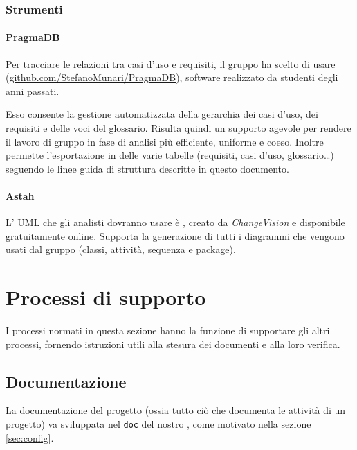 	\subsubsection{Strumenti}
		\paragraph{PragmaDB}
		Per tracciare le relazioni tra casi d'uso e requisiti, il gruppo ha scelto di usare  (\url{github.com/StefanoMunari/PragmaDB}), software realizzato da studenti degli anni passati.
		
		Esso consente la gestione automatizzata della gerarchia dei casi d'uso, dei requisiti e delle voci del glossario. Risulta quindi un supporto agevole per rendere il lavoro di gruppo in fase di analisi più efficiente, uniforme e coeso. Inoltre permette l'esportazione in  delle varie tabelle (requisiti, casi d'uso, glossario\dots) seguendo le linee guida di struttura descritte in questo documento.

		\paragraph{Astah}
		L' UML che gli analisti dovranno usare è , creato da \emph{ChangeVision} e disponibile gratuitamente online. Supporta la generazione di tutti i diagrammi che vengono usati dal gruppo (classi, attività, sequenza e package).





\section{Processi di supporto} \label{sec:supporto}
I processi normati in questa sezione hanno la funzione di supportare gli altri processi, fornendo istruzioni utili alla stesura dei documenti e alla loro verifica.

\subsection{Documentazione} \label{sec:doc}
La documentazione del progetto (ossia tutto ciò che documenta le attività di un progetto) va sviluppata nel  \texttt{doc} del nostro , come motivato nella sezione \ref{sec:config}.

